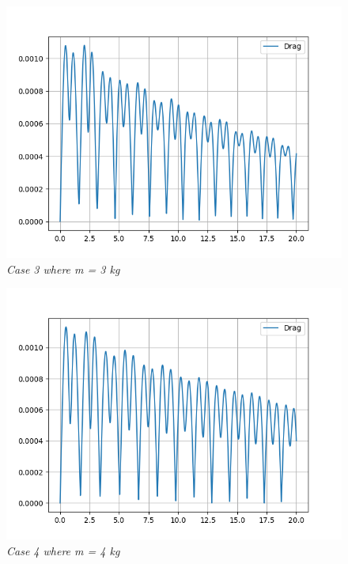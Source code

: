     \begin{figure}[H]
        \centering
        \includegraphics{Appendix/Derived Data Pictures/dm3.png}
        \caption{\textit{Case 3 where m = 3 kg}}
        \label{}
    \end{figure}
            
    \begin{figure}[H]
        \centering
        \includegraphics{Appendix/Derived Data Pictures/dm4.png}
        \caption{\textit{Case 4 where m = 4 kg}}
        \label{}
    \end{figure}
            

